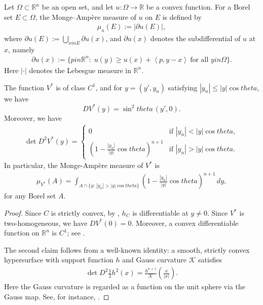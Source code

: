 \documentclass[12pt]{amsart}
\def\theta{theta}%
\def\in{in }%
\numberwithin{equation}{section}
\newcommand{\bbR}{\mathbb{R}}
\newcommand{\8}{\infty}
\newcommand{\cK}{\mathcal{K}}
\newcommand{\ip}[2]{\left\langle #1,#2 \right\rangle}
\renewcommand{\(}{\left(}
\renewcommand{\)}{\right)}
\newcommand{\eq}[1]{\begin{equation}\begin{alignedat}{2} #1 \end{alignedat}\end{equation}}
\begin{document}
Let $\Omega\subset \bbR^n$ be an open set, and let $u:\Omega\to \bbR$ be a convex function. For a Borel set $E\subset \Omega$, the Monge--Amp\`ere measure of $u$ on $E$ is defined by
\eq{
\mu_u(E):=|\partial u(E)|,
}
where $\partial u(E):=\bigcup_{x\in E}\partial u(x)$, and $\partial u(x)$ denotes the subdifferential of $u$ at $x$, namely
\eq{
\partial u(x):=\{p\in \bbR^n:\; u(y)\geq u(x)+\ip{p}{y-x}\ \text{for all } y\in \Omega\}.
}
Here $|\cdot|$ denotes the Lebesgue measure in $\bbR^n$.


\begin{lemma}\label{lem 2}
The function $V^{\ast}$ is of class $C^1$, and for $y=(y',y_n)$ satisfying $|y_n| \leq |y| \cos \theta$, we have
\begin{equation}
DV^{\ast}(y) = \sin^2 \theta \, (y', 0).
\end{equation}
Moreover, we have
\eq{
\det D^2V^{\ast}(y) =
\begin{cases}
0 & \text{if } |y_n| < |y| \cos \theta , \\
(1-\frac{|y_n|}{|y|}\cos\theta)^{n+1} & \text{if } |y_n| > |y| \cos \theta.
\end{cases}
}
In particular, the Monge-Amp\`ere measure of $V^{\ast}$ is
\eq{
\mu_{V^{\ast}}(A)=\int_{A\cap\{y:\, |y_n|>|y|\cos\theta \}}\(1-\frac{|y_n|}{|y|}\cos\theta\)^{n+1}\, dy,
}
for any Borel set $A$.
\end{lemma}
\begin{proof} 
Since $C$ is strictly convex, by \cite[Cor. 1.7.3]{Schneider}, $h_C$ is differentiable at $y \neq 0$. Since $V^{\ast}$ is two-homogeneous, we have $DV^{\ast}(0) = 0$. Moreover, a convex differentiable function on $\mathbb{R}^n$ is $C^1$; see \cite[Thm. 1.5.4]{Schneider}.

The second claim follows from a well-known identity: a smooth, strictly convex hypersurface with support function $h$ and Gauss curvature $\cK$ satisfies
\eq{
\det D^2\frac{1}{2}h^2(x)=\frac{h^{n+1}}{\mathcal{K}}\left(\frac{x}{|x|}\right).
}
Here the Gauss curvature is regarded as a function on the unit sphere via the Gauss map. See, for instance, \cite[Thm. 3.1]{MP14}.
\end{proof}
\end{document}
